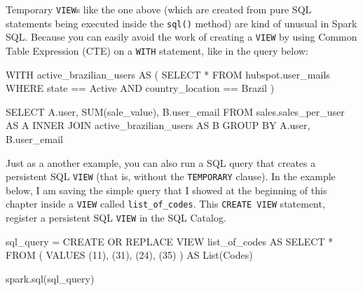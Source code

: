 \documentclass[
  11pt,
  letterpaper,
  DIV=11,
  numbers=noendperiod]{scrreprt}
\newenvironment{Shaded}{\begin{snugshade}}{\end{snugshade}}
\newcommand{\FunctionTok}[1]{\textcolor[rgb]{0.28,0.35,0.67}{#1}}
\newcommand{\KeywordTok}[1]{\textcolor[rgb]{0.00,0.23,0.31}{#1}}
\newcommand{\NormalTok}[1]{\textcolor[rgb]{0.00,0.23,0.31}{#1}}
\newcommand{\OperatorTok}[1]{\textcolor[rgb]{0.37,0.37,0.37}{#1}}
\newcommand{\StringTok}[1]{\textcolor[rgb]{0.13,0.47,0.30}{#1}}
\begin{document}
Temporary \texttt{VIEW}s like the one above (which are created from pure
SQL statements being executed inside the \texttt{sql()} method) are kind
of unusual in Spark SQL. Because you can easily avoid the work of
creating a \texttt{VIEW} by using Common Table Expression (CTE) on a
\texttt{WITH} statement, like in the query below:

\begin{Shaded}
\begin{Highlighting}[]
\KeywordTok{WITH}\NormalTok{ active\_brazilian\_users }\KeywordTok{AS}\NormalTok{ (}
  \KeywordTok{SELECT} \OperatorTok{*}
  \KeywordTok{FROM}\NormalTok{ hubspot.user\_mails}
  \KeywordTok{WHERE}\NormalTok{ state }\OperatorTok{==} \StringTok{\textquotesingle{}Active\textquotesingle{}}
  \KeywordTok{AND}\NormalTok{ country\_location }\OperatorTok{==} \StringTok{\textquotesingle{}Brazil\textquotesingle{}}
\NormalTok{)}

\KeywordTok{SELECT}\NormalTok{ A.}\FunctionTok{user}\NormalTok{, }\FunctionTok{SUM}\NormalTok{(sale\_value), B.user\_email}
\KeywordTok{FROM}\NormalTok{ sales.sales\_per\_user }\KeywordTok{AS}\NormalTok{ A}
\KeywordTok{INNER} \KeywordTok{JOIN}\NormalTok{ active\_brazilian\_users }\KeywordTok{AS}\NormalTok{ B}
\KeywordTok{GROUP} \KeywordTok{BY}\NormalTok{ A.}\FunctionTok{user}\NormalTok{, B.user\_email}
\end{Highlighting}
\end{Shaded}

Just as a another example, you can also run a SQL query that creates a
persistent SQL \texttt{VIEW} (that is, without the \texttt{TEMPORARY}
clause). In the example below, I am saving the simple query that I
showed at the beginning of this chapter inside a \texttt{VIEW} called
\texttt{list\_of\_codes}. This \texttt{CREATE\ VIEW} statement, register
a persistent SQL \texttt{VIEW} in the SQL Catalog.

\begin{Shaded}
\begin{Highlighting}[]
\NormalTok{sql\_query }\OperatorTok{=} \StringTok{\textquotesingle{}\textquotesingle{}\textquotesingle{}}
\StringTok{CREATE OR REPLACE VIEW list\_of\_codes AS}
\StringTok{SELECT *}
\StringTok{FROM (}
\StringTok{  VALUES (11), (31), (24), (35)}
\StringTok{) AS List(Codes)}
\StringTok{\textquotesingle{}\textquotesingle{}\textquotesingle{}}

\NormalTok{spark.sql(sql\_query)}
\end{Highlighting}
\end{Shaded}
\end{document}
